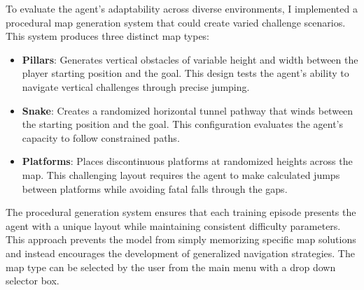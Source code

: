 To evaluate the agent's adaptability across diverse environments, I implemented a procedural map generation system that could create varied challenge scenarios. This system produces three distinct map types:

\begin{itemize}
    \item \textbf{Pillars}: Generates vertical obstacles of variable height and width between the player starting position and the goal. This design tests the agent's ability to navigate vertical challenges through precise jumping.
    \item \textbf{Snake}: Creates a randomized horizontal tunnel pathway that winds between the starting position and the goal. This configuration evaluates the agent's capacity to follow constrained paths.
    \item \textbf{Platforms}: Places discontinuous platforms at randomized heights across the map. This challenging layout requires the agent to make calculated jumps between platforms while avoiding fatal falls through the gaps.
\end{itemize}

The procedural generation system ensures that each training episode presents the agent with a unique layout while maintaining consistent difficulty parameters. 
This approach prevents the model from simply memorizing specific map solutions and instead encourages the development of generalized navigation strategies.
The map type can be selected by the user from the main menu with a drop down selector box.

